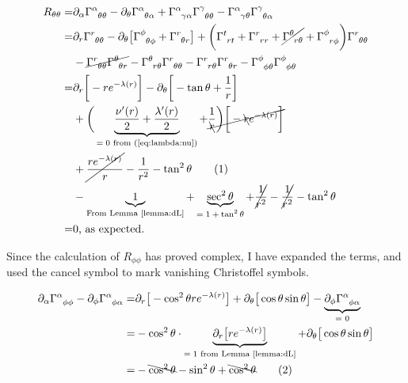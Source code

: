 \documentclass[]{article}
\newcommand\numberthis{\addtocounter{equation}{1}\tag{\theequation}}
\begin{document}
\begin{align*}
	R_{\theta\theta} =& \partial_\alpha \Gamma\indices{^\alpha_{\theta\theta}} - \partial_\theta \Gamma\indices{^\alpha_{\theta\alpha}} + \Gamma\indices{^\alpha_{\gamma\alpha}} \Gamma\indices{^\gamma_{\theta\theta}} - \Gamma\indices{^\alpha_{\gamma\theta}} \Gamma\indices{^\gamma_{\theta\alpha}}\\
	=& \partial_r \Gamma\indices{^r_{\theta\theta}} - \partial_\theta \big[\Gamma\indices{^\phi_{\theta\phi}}+\Gamma\indices{^r_{\theta r}}\big] + \bigg(\Gamma\indices{^t_{rt}}+\Gamma\indices{^r_{rr}}+\cancel{\Gamma\indices{^\theta_{r\theta}}}+\Gamma\indices{^\phi_{r\phi}}\bigg) \Gamma\indices{^r_{\theta\theta}}\\ &-\cancel{ \Gamma\indices{^r_{\theta\theta}} \Gamma\indices{^\theta_{\theta r}}}  - \Gamma\indices{^\theta_{r\theta}} \Gamma\indices{^r_{\theta\theta}} -\Gamma\indices{^r_{r\theta}} \Gamma\indices{^r_{\theta r}} - \Gamma\indices{^\phi_{\phi\theta}} \Gamma\indices{^\phi_{\phi\theta}}\\
	=& \partial_r \bigg[-r  e^{-\lambda(r)}\bigg] - \partial_\theta \bigg[-\tan \theta +\frac{1}{r}\bigg] \\
	 &+ \bigg(\underbrace{\frac{\nu^\prime(r)}{2}+\frac{\lambda^\prime(r)}{2}}_\text{$=0$ from (\ref{eq:lambda:nu})}+\cancel{\frac{1}{\bcancel{r}}\bigg)\bigg[ -\bcancel{r}  e^{-\lambda(r)}\bigg]}\\
	 & + \cancel{\frac{r e^{-\lambda(r)}}{r}}	 -\frac{1}{r^2} - \tan^2 \theta  \numberthis \label{eq:R:theta:theta}\\
    & - \underbrace{1}_\text{\text{From Lemma \ref{lemma:dL}}} + \underbrace{\sec^2 \theta}_\text{$=1+\tan^2 \theta$} + \cancel{\frac{1}{r^2}} -\cancel{\frac{1}{r^2}} - \tan^2 \theta \\
	=& 0 \text{, as expected.}
\end{align*}

Since the calculation of $R_{\phi\phi}$ has proved complex, I have expanded the terms, and used the cancel symbol to mark vanishing Christoffel symbols.

\begin{align*}
	\partial_\alpha \Gamma\indices{^\alpha_{\phi\phi}} - \partial_\phi \Gamma\indices{^\alpha_{\phi\alpha}} =& \partial_r \big[- \cos^2 \theta r e^{-\lambda(r)}\big]+ \partial_\theta \big[\cos\theta \sin\theta\big]-\underbrace{\partial_\phi \Gamma\indices{^\alpha_{\phi\alpha}}}_\text{= 0}\\
	=& - \cos^2 \theta \cdot \underbrace{\partial_r \big[ r e^{-\lambda(r)}\big]}_\text{$=1$ from Lemma \ref{lemma:dL}}+ \partial_\theta \big[\cos\theta \sin\theta\big]\\
	=& - \bcancel{\cos^2 \theta} -\sin^2\theta +\bcancel{\cos^2 \theta} \numberthis \label{eq:phi:phi:deriv}
\end{align*}
\end{document}
